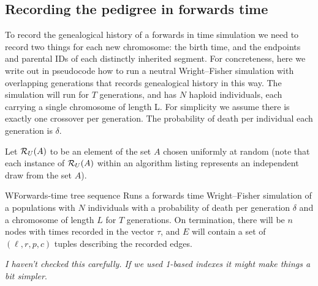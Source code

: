 \documentclass{article}
\newcommand{\jk}[1]{{\em \color{red} #1}}
\begin{document}
\subsection*{Recording the pedigree in forwards time}

To record the genealogical history of a forwards in time simulation
we need to record two things for each new chromosome:
the birth time, and the endpoints and parental IDs of each distinctly inherited segment.
For concreteness, here we write out in pseudocode how to run a neutral Wright--Fisher simulation
with overlapping generations that records genealogical history in this way.
The simulation will run for $T$ generations,
and has $N$ haploid individuals, each carrying a single chromosome of length L.
For simplicity we assume there is exactly one crossover per generation.
The probability of death per individual each generation is $\delta$.

Let $\mathcal{R}_U(A)$ to be an element of the set $A$ chosen
uniformly at random (note that each instance of $\mathcal{R}_U(A)$ within
an algorithm listing represents an independent draw from the set $A$).

\begin{taocpalg}{W}{Forwards-time tree sequence}
{Runs a forwards time Wright--Fisher simulation of a populations with $N$
individuals with a probability of death per generation $\delta$ and a chromosome of length
$L$ for $T$ generations. On termination, there will be $n$ nodes with times recorded
in the vector $\tau$, and $E$ will contain a set of $(\ell, r, p, c)$ tuples
describing the recorded edges.
}




\algstep{W4.}{Mortality.}{ If $\randomuniform([0, 1)) \geq \delta$ go to \algref{W8}.
}


\algstep{W6.}{Choose parents.}{Set $a \leftarrow \randomuniform(\{0, \dots, N - 1\})$,
    $b \leftarrow \randomuniform(\{0, \dots, N - 1\})$ and $x \leftarrow \randomuniform([0, L))$.
}



\jk{I haven't checked this carefully. If we used 1-based indexes it might make things a bit
simpler}.
\end{taocpalg}
\end{document}
